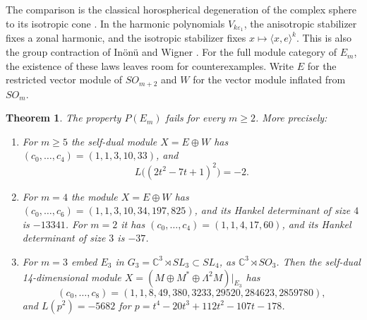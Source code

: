 \documentclass[11pt,reqno]{amsart}
\newtheorem{theorem}{Theorem}[section]
\theoremstyle{definition}
\newcommand{\CC}{\mathbb C}
\begin{document}
The comparison is the classical horospherical degeneration of the complex sphere to its isotropic cone \cite[\S1.2, Theorem~5 and Example~2]{Timashev}. In the harmonic polynomials $V_{k\varepsilon_1}$, the anisotropic stabilizer fixes a zonal harmonic, and the isotropic stabilizer fixes $x\mapsto\langle x,e\rangle^k$. This is also the group contraction of In\"on\"u and Wigner \cite{IW}. For the full module category of $E_m$, the existence of these laws leaves room for counterexamples. Write $E$ for the restricted vector module of $SO_{m+2}$ and $W$ for the vector module inflated from $SO_m$.

\begin{theorem}\label{thm:euclidean}
The property $P(E_m)$ fails for every $m\geq2$. More precisely:
\begin{enumerate}
\item For $m\geq5$ the self-dual module $X=E\oplus W$ has $(c_0,\ldots,c_4)=(1,1,3,10,33)$, and
\[
   L\bigl((2t^2-7t+1)^2\bigr)=-2 .
\]
\item For $m=4$ the module $X=E\oplus W$ has $(c_0,\ldots,c_6)=(1,1,3,10,34,197,825)$, and its Hankel determinant of size $4$ is $-13341$. For $m=2$ it has $(c_0,\ldots,c_4)=(1,1,4,17,60)$, and its Hankel determinant of size $3$ is $-37$.
\item For $m=3$ embed $E_3$ in $G_3=\CC^3\rtimes SL_3\subset SL_4$, as $\CC^3\rtimes SO_3$. Then the self-dual 14-dimensional module $X=(M\oplus M^*\oplus\Lambda^2M)|_{E_3}$ has
\[
   (c_0,\ldots,c_8)=(1,1,8,49,380,3233,29520,284623,2859780),
\]
and $L(p^2)=-5682$ for $p=t^4-20t^3+112t^2-107t-178$.
\end{enumerate}
\end{theorem}
\end{document}

